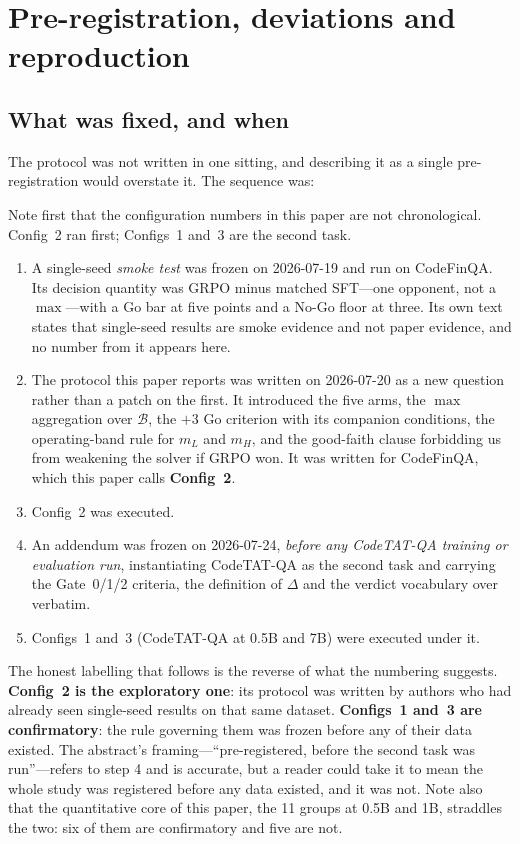 \section{Pre-registration, deviations and reproduction}
\label{app:reproduce}

\subsection{What was fixed, and when}

The protocol was not written in one sitting, and describing it as a single
pre-registration would overstate it. The sequence was:

Note first that the configuration numbers in this paper are not chronological.
Config~2 ran first; Configs~1 and~3 are the second task.

\begin{enumerate}
\item A single-seed \emph{smoke test} was frozen on 2026-07-19 and run on
CodeFinQA. Its decision quantity was GRPO minus matched SFT---one opponent, not
a $\max$---with a Go bar at five points and a No-Go floor at three. Its own text
states that single-seed results are smoke evidence and not paper evidence, and
no number from it appears here.
\item The protocol this paper reports was written on 2026-07-20 as a new
question rather than a patch on the first. It introduced the five arms, the
$\max$ aggregation over $\mathcal{B}$, the $+3$ Go criterion with its companion
conditions, the operating-band rule for $m_L$ and $m_H$, and the good-faith
clause forbidding us from weakening the solver if GRPO won. It was written for
CodeFinQA, which this paper calls \textbf{Config~2}.
\item Config~2 was executed.
\item An addendum was frozen on 2026-07-24, \emph{before any CodeTAT-QA
training or evaluation run}, instantiating CodeTAT-QA as the second task and
carrying the Gate~0/1/2 criteria, the definition of $\Delta$ and the verdict
vocabulary over verbatim.
\item Configs~1 and~3 (CodeTAT-QA at 0.5B and 7B) were executed under it.
\end{enumerate}

The honest labelling that follows is the reverse of what the numbering
suggests. \textbf{Config~2 is the exploratory one}: its protocol was written by
authors who had already seen single-seed results on that same dataset.
\textbf{Configs~1 and~3 are confirmatory}: the rule governing them was frozen
before any of their data existed. The abstract's framing---``pre-registered,
before the second task was run''---refers to step 4 and is accurate, but a
reader could take it to mean the whole study was registered before any data
existed, and it was not. Note also that the quantitative core of this paper, the
11 groups at 0.5B and 1B, straddles the two: six of them are confirmatory and
five are not.

